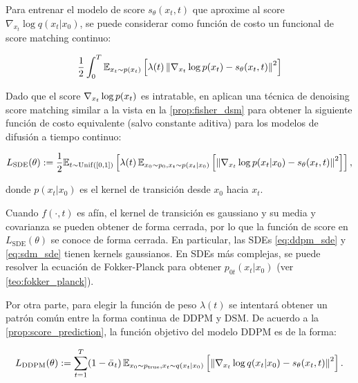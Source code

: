 
Para  entrenar el modelo de score $s_\theta(x_t,t)$ que aproxime al score $\nabla_{x_t}\log q(x_t|x_0)$, se puede considerar como función de costo un funcional de score matching continuo:

\begin{equation*}
    \frac{1}{2}\int_0^T \mathbb{E}_{x_t\sim p(x_t)}\left[\lambda(t)\left\lVert \nabla_{x_t} \log p(x_t)-s_\theta(x_t,t) \right\rVert^2\right]
\end{equation*}

Dado que el score $\nabla_{x_t} \log p(x_t)$ es intratable, en \cite{song2021scorebased} aplican una técnica de denoising score matching similar a la vista en la \autoref{prop:fisher_dsm} para obtener la siguiente función de costo equivalente (salvo constante aditiva) para los modelos de difusión a tiempo continuo:

\begin{equation}
    \label{eq:loss_continuous_dm}
    L_{\text{SDE}}(\theta) :=\frac{1}{2} \mathbb{E}_{t\sim\operatorname{Unif}([0,1])}\left[\lambda(t)\,\mathbb{E}_{x_0\sim p_0, x_t\sim p(x_t|x_0)}\left[\left\lVert \nabla_{x_t} \log p(x_t|x_0) - s_\theta(x_t,t) \right\rVert^2\right]\right],
\end{equation}

donde $p(x_t|x_0)$ es el kernel de transición desde $x_0$ hacia $x_t$.

Cuando $f(\cdot,t)$ es afín, el kernel de transición es gaussiano y su media y covarianza se pueden obtener de forma cerrada, por lo que la función de score en $L_{\text{SDE}}(\theta)$ se conoce de forma cerrada. En particular, las SDEs \eqref{eq:ddpm_sde} y \eqref{eq:sdm_sde} tienen kernels gaussianos. En SDEs más complejas, se puede resolver la ecuación de Fokker-Planck para obtener $p_{0t}(x_t|x_0)$ (ver \autoref{teo:fokker_planck}).

Por otra parte, para elegir la función de peso $\lambda(t)$ se intentará obtener un patrón común entre la forma continua de DDPM y DSM. De acuerdo a la \autoref{prop:score_prediction}, la función objetivo del modelo DDPM es de la forma:

\begin{equation*}
    L_{\text{DDPM}}(\theta) := \sum_{t=1}^T (1-\bar\alpha_t)\,\mathbb{E}_{x_0\sim p_{\operatorname{true}}, x_t\sim q(x_t|x_0)}\left[\left\lVert \nabla_{x_t}\log q(x_t|x_0) - s_\theta(x_t,t) \right\rVert^2\right].
\end{equation*}

